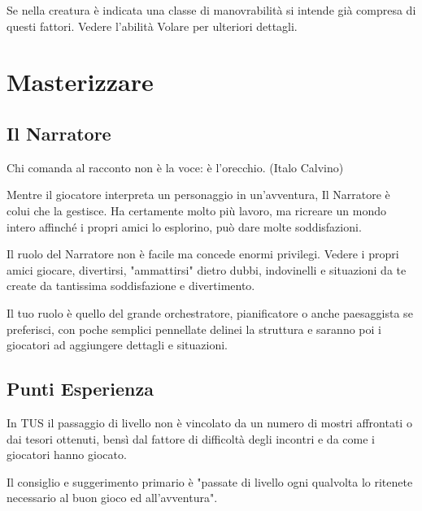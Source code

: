 \documentclass[a4paper,11pt,twoside,openany]{book}
\begin{document}
Se nella creatura è indicata una classe di manovrabilità si intende già compresa di questi fattori. Vedere l'abilità Volare per ulteriori dettagli.

\pagebreak

\section{Masterizzare}

\label{masterizzare}


\subsection{Il Narratore}

\begin{tcolorbox}[enhanced,arc=5pt,boxrule=0.3pt]{Chi comanda al racconto non è la voce: è l'orecchio. (Italo Calvino)}\end{tcolorbox}\medskip


\label{il-narratore}

Mentre il giocatore interpreta un personaggio in un'avventura, Il Narratore è colui che la gestisce. Ha certamente molto più lavoro, ma ricreare un mondo intero affinché i propri amici lo esplorino, può dare molte soddisfazioni.

Il ruolo del Narratore non è facile ma concede enormi privilegi. Vedere i propri amici giocare, divertirsi, "ammattirsi" dietro dubbi, indovinelli e situazioni da te create da tantissima soddisfazione e divertimento.

Il tuo ruolo è quello del grande orchestratore, pianificatore o anche paesaggista se preferisci, con poche semplici pennellate delinei la struttura e saranno poi i giocatori ad aggiungere dettagli e situazioni.



\subsection{Punti Esperienza}

\label{punti-esperienza}

In TUS il passaggio di livello non è vincolato da un numero di mostri affrontati o dai tesori ottenuti, bensì dal fattore di difficoltà degli incontri e da come i giocatori hanno giocato.

Il consiglio e suggerimento primario è "passate di livello ogni qualvolta lo ritenete necessario al buon gioco ed all'avventura".
\end{document}
